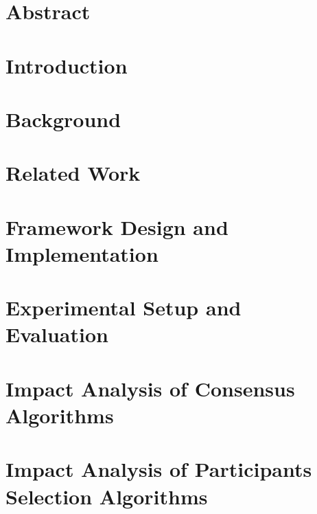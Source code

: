 \documentclass[12pt,a4paper,oneside]{book}
\begin{document}



\chapter*{Abstract}\label{chapter:abstract}


\tableofcontents

\listoffigures

\listoftables

\chapter{Introduction}\label{chapter:introduction}


\chapter{Background}\label{chapter:background}


\chapter{Related Work}\label{chapter:related_work}


\chapter{Framework Design and Implementation}\label{chapter:framework}


\chapter{Experimental Setup and Evaluation}\label{chapter:evaluation}


\chapter{Impact Analysis of Consensus Algorithms}\label{chapter:analysis:consensus_algorithms}


\chapter{Impact Analysis of Participants Selection Algorithms}\label{chapter:analysis:participants}

\end{document}
